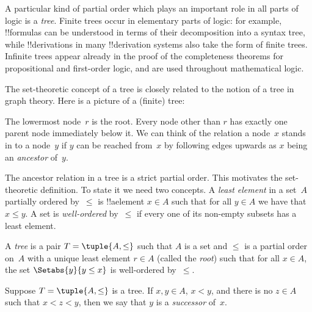 \documentclass[../../../include/open-logic-section]{subfiles}
\begin{document}

A particular kind of partial order which plays an important role in
all parts of logic is a \emph{tree}. Finite trees occur in elementary
parts of logic: for example, !!{formula}s can be understood in terms
of their decomposition into a syntax tree, while !!{derivation}s in
many !!{derivation} systems also take the form of finite trees.
%
Infinite trees appear already in the proof of the completeness
theorems for propositional and first-order logic, and are used
throughout mathematical logic.

The set-theoretic concept of a tree is closely related to the notion
of a tree in graph theory. Here is a picture of a (finite) tree:

\begin{center}
\end{center}

The lowermost node~$r$ is the root. Every node other than $r$ has
exactly one parent node immediately below it. We can think of the relation
a node~$x$ stands in to a node~$y$ if $y$ can be reached from~$x$ by
following edges upwards as $x$ being an \emph{ancestor} of~$y$. 

The ancestor relation in a tree is a strict partial order. This
motivates the set-theoretic definition. To state it we need two
concepts. A \emph{least element} in a set~$A$ partially ordered
by~$\le$ is !!a{element} $x \in A$ such that for all $y \in A$ we have
that~$x \le y$. A set is \emph{well-ordered} by~$\le$ if every one of
its non-empty subsets has a least element.

\begin{defn}[Tree]
A \emph{tree} is a pair $T = \tuple{A, \le}$ such that $A$ is a set
and $\le$ is a partial order on~$A$ with a unique least element
$r \in A$ (called the \emph{root}) such that for all $x \in A$,
the set $\Setabs{y}{y \le x}$ is well-ordered by~$\le$.
\end{defn}

\begin{defn}[Successors]
Suppose $T = \tuple{A, \le}$ is a tree.
If $x,y \in A$, $x < y$, and there is no $z \in A$ such that
$x < z < y$, then we say that $y$ is a \emph{successor} of~$x$.
\end{defn}
\end{document}
